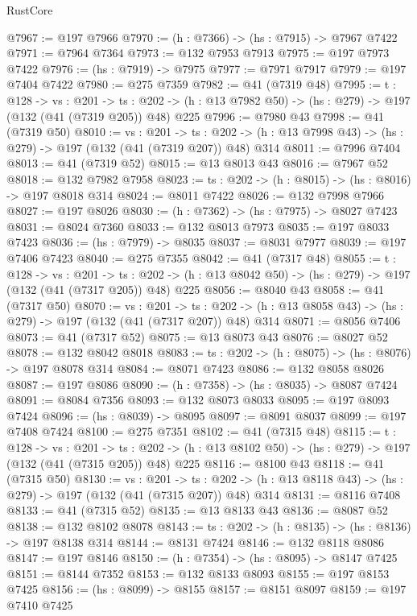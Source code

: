 \begin{lexlean}{RustCore}
\begin{coremodule}
@7967 := @197 @7966
@7970 := (h : @7366) -> (hs : @7915) -> @7967 @7422
@7971 := @7964 @7364
@7973 := @132 @7953 @7913
@7975 := @197 @7973 @7422
@7976 := (hs : @7919) -> @7975
@7977 := @7971 @7917
@7979 := @197 @7404 @7422
@7980 := @275 @7359
@7982 := @41 (@7319 @48)
@7995 := {t : @128} ->
  {vs : @201} ->
  {ts : @202} -> (h : @13 @7982 @50) -> (hs : @279) -> @197 (@132 (@41 (@7319 @205)) @48) @225
@7996 := @7980 @43
@7998 := @41 (@7319 @50)
@8010 := {vs : @201} ->
  {ts : @202} -> (h : @13 @7998 @43) -> (hs : @279) -> @197 (@132 (@41 (@7319 @207)) @48) @314
@8011 := @7996 @7404
@8013 := @41 (@7319 @52)
@8015 := @13 @8013 @43
@8016 := @7967 @52
@8018 := @132 @7982 @7958
@8023 := {ts : @202} -> (h : @8015) -> (hs : @8016) -> @197 @8018 @314
@8024 := @8011 @7422
@8026 := @132 @7998 @7966
@8027 := @197 @8026
@8030 := (h : @7362) -> (hs : @7975) -> @8027 @7423
@8031 := @8024 @7360
@8033 := @132 @8013 @7973
@8035 := @197 @8033 @7423
@8036 := (hs : @7979) -> @8035
@8037 := @8031 @7977
@8039 := @197 @7406 @7423
@8040 := @275 @7355
@8042 := @41 (@7317 @48)
@8055 := {t : @128} ->
  {vs : @201} ->
  {ts : @202} -> (h : @13 @8042 @50) -> (hs : @279) -> @197 (@132 (@41 (@7317 @205)) @48) @225
@8056 := @8040 @43
@8058 := @41 (@7317 @50)
@8070 := {vs : @201} ->
  {ts : @202} -> (h : @13 @8058 @43) -> (hs : @279) -> @197 (@132 (@41 (@7317 @207)) @48) @314
@8071 := @8056 @7406
@8073 := @41 (@7317 @52)
@8075 := @13 @8073 @43
@8076 := @8027 @52
@8078 := @132 @8042 @8018
@8083 := {ts : @202} -> (h : @8075) -> (hs : @8076) -> @197 @8078 @314
@8084 := @8071 @7423
@8086 := @132 @8058 @8026
@8087 := @197 @8086
@8090 := (h : @7358) -> (hs : @8035) -> @8087 @7424
@8091 := @8084 @7356
@8093 := @132 @8073 @8033
@8095 := @197 @8093 @7424
@8096 := (hs : @8039) -> @8095
@8097 := @8091 @8037
@8099 := @197 @7408 @7424
@8100 := @275 @7351
@8102 := @41 (@7315 @48)
@8115 := {t : @128} ->
  {vs : @201} ->
  {ts : @202} -> (h : @13 @8102 @50) -> (hs : @279) -> @197 (@132 (@41 (@7315 @205)) @48) @225
@8116 := @8100 @43
@8118 := @41 (@7315 @50)
@8130 := {vs : @201} ->
  {ts : @202} -> (h : @13 @8118 @43) -> (hs : @279) -> @197 (@132 (@41 (@7315 @207)) @48) @314
@8131 := @8116 @7408
@8133 := @41 (@7315 @52)
@8135 := @13 @8133 @43
@8136 := @8087 @52
@8138 := @132 @8102 @8078
@8143 := {ts : @202} -> (h : @8135) -> (hs : @8136) -> @197 @8138 @314
@8144 := @8131 @7424
@8146 := @132 @8118 @8086
@8147 := @197 @8146
@8150 := (h : @7354) -> (hs : @8095) -> @8147 @7425
@8151 := @8144 @7352
@8153 := @132 @8133 @8093
@8155 := @197 @8153 @7425
@8156 := (hs : @8099) -> @8155
@8157 := @8151 @8097
@8159 := @197 @7410 @7425

\end{coremodule}
\end{lexlean}
